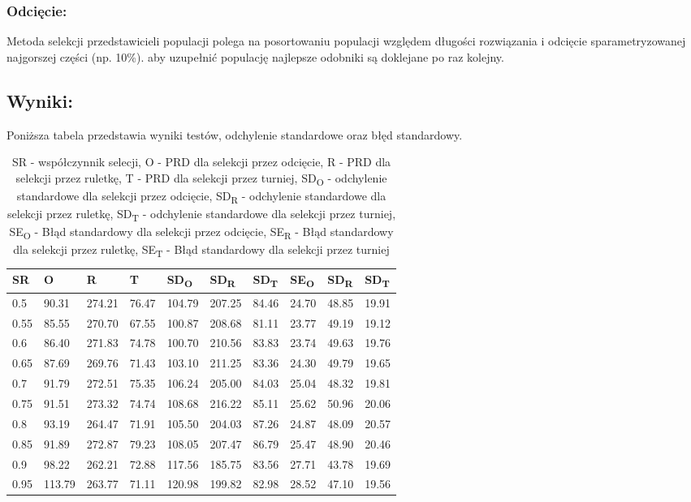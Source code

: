     \subsubsection{Odcięcie:}
    Metoda selekcji przedstawicieli populacji polega na posortowaniu populacji względem długości rozwiązania i odcięcie sparametryzowanej najgorszej części (np. 10\%). aby uzupełnić populację najlepsze odobniki są doklejane po raz kolejny.
  \subsection{Wyniki: }
  Poniższa tabela przedstawia wyniki testów, odchylenie standardowe oraz błęd standardowy.
  \begin{table}[!ht]
    \centering
    \begin{tabular}{|l|l|l|l|l|l|l|l|l|l|}
    \hline
        SR & O & R & T & SD\textsubscript{O} & SD\textsubscript{R} & SD\textsubscript{T} & SE\textsubscript{O} & SD\textsubscript{R} & SD\textsubscript{T} \\ \hline
        0.5 & 90.31 & 274.21 & 76.47 & 104.79 & 207.25 & 84.46 & 24.70 & 48.85 & 19.91 \\ \hline
        0.55 & 85.55 & 270.70 & 67.55 & 100.87 & 208.68 & 81.11 & 23.77 & 49.19 & 19.12 \\ \hline
        0.6 & 86.40 & 271.83 & 74.78 & 100.70 & 210.56 & 83.83 & 23.74 & 49.63 & 19.76 \\ \hline
        0.65 & 87.69 & 269.76 & 71.43 & 103.10 & 211.25 & 83.36 & 24.30 & 49.79 & 19.65 \\ \hline
        0.7 & 91.79 & 272.51 & 75.35 & 106.24 & 205.00 & 84.03 & 25.04 & 48.32 & 19.81 \\ \hline
        0.75 & 91.51 & 273.32 & 74.74 & 108.68 & 216.22 & 85.11 & 25.62 & 50.96 & 20.06 \\ \hline
        0.8 & 93.19 & 264.47 & 71.91 & 105.50 & 204.03 & 87.26 & 24.87 & 48.09 & 20.57 \\ \hline
        0.85 & 91.89 & 272.87 & 79.23 & 108.05 & 207.47 & 86.79 & 25.47 & 48.90 & 20.46 \\ \hline
        0.9 & 98.22 & 262.21 & 72.88 & 117.56 & 185.75 & 83.56 & 27.71 & 43.78 & 19.69 \\ \hline
        0.95 & 113.79 & 263.77 & 71.11 & 120.98 & 199.82 & 82.98 & 28.52 & 47.10 & 19.56 \\ \hline
    \end{tabular}
    \caption{
      SR - współczynnik selecji,
      O - PRD dla selekcji przez odcięcie, 
      R - PRD dla selekcji przez ruletkę, 
      T - PRD dla selekcji przez turniej, 
      SD\textsubscript{O} - odchylenie standardowe dla selekcji przez odcięcie, 
      SD\textsubscript{R} - odchylenie standardowe dla selekcji przez ruletkę, 
      SD\textsubscript{T} - odchylenie standardowe dla selekcji przez turniej, 
      SE\textsubscript{O} - Błąd standardowy dla selekcji przez odcięcie,
      SE\textsubscript{R} - Błąd standardowy dla selekcji przez ruletkę, 
      SE\textsubscript{T} - Błąd standardowy dla selekcji przez turniej
    }

  \end{table}
